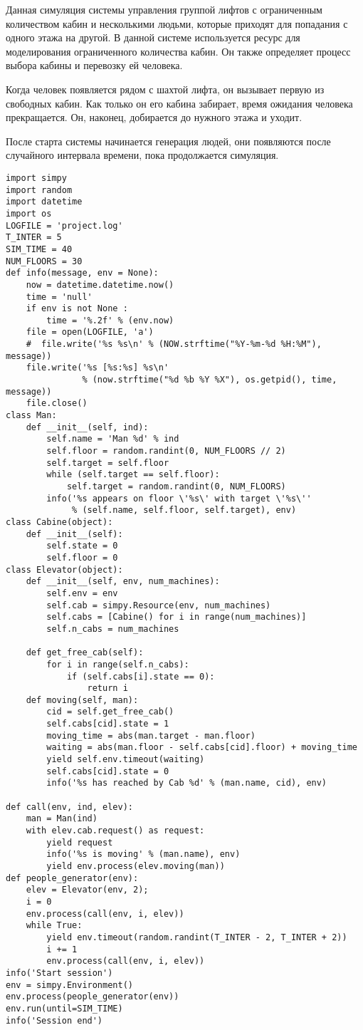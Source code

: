 
	Данная симуляция системы управления группой лифтов с ограниченным количеством кабин и несколькими людьми,
		которые приходят для попадания с одного этажа на другой.
		В данной системе используется ресурс для моделирования ограниченного количества кабин.
		Он также определяет процесс выбора кабины и перевозку ей человека.

	Когда человек появляется рядом с шахтой лифта, он вызывает первую из свободных кабин.
		Как только он его кабина забирает, время ожидания человека прекращается.
		Он, наконец, добирается до нужного этажа и уходит.

	После старта системы начинается генерация людей, они появляются после случайного интервала времени,
	пока продолжается симуляция.

\begin{lstlisting}[basicstyle=\footnotesize]
import simpy
import random
import datetime
import os
LOGFILE = 'project.log'
T_INTER = 5
SIM_TIME = 40
NUM_FLOORS = 30
def info(message, env = None):
    now = datetime.datetime.now()
    time = 'null'
    if env is not None :
        time = '%.2f' % (env.now)
    file = open(LOGFILE, 'a')
    #  file.write('%s %s\n' % (NOW.strftime("%Y-%m-%d %H:%M"), message))
    file.write('%s [%s:%s] %s\n'
               % (now.strftime("%d %b %Y %X"), os.getpid(), time, message))
    file.close()
class Man:
    def __init__(self, ind):
        self.name = 'Man %d' % ind
        self.floor = random.randint(0, NUM_FLOORS // 2)
        self.target = self.floor
        while (self.target == self.floor):
            self.target = random.randint(0, NUM_FLOORS)
        info('%s appears on floor \'%s\' with target \'%s\''
             % (self.name, self.floor, self.target), env)
class Cabine(object):
    def __init__(self):
        self.state = 0
        self.floor = 0
class Elevator(object):
    def __init__(self, env, num_machines):
        self.env = env
        self.cab = simpy.Resource(env, num_machines)
        self.cabs = [Cabine() for i in range(num_machines)]
        self.n_cabs = num_machines

    def get_free_cab(self):
        for i in range(self.n_cabs):
            if (self.cabs[i].state == 0):
                return i
    def moving(self, man):
        cid = self.get_free_cab()
        self.cabs[cid].state = 1
        moving_time = abs(man.target - man.floor)
        waiting = abs(man.floor - self.cabs[cid].floor) + moving_time
        yield self.env.timeout(waiting)
        self.cabs[cid].state = 0
        info('%s has reached by Cab %d' % (man.name, cid), env)

def call(env, ind, elev):
    man = Man(ind)
    with elev.cab.request() as request:
        yield request
        info('%s is moving' % (man.name), env)
        yield env.process(elev.moving(man))
def people_generator(env):
    elev = Elevator(env, 2);
    i = 0
    env.process(call(env, i, elev))
    while True:
        yield env.timeout(random.randint(T_INTER - 2, T_INTER + 2))
        i += 1
        env.process(call(env, i, elev))
info('Start session')
env = simpy.Environment()
env.process(people_generator(env))
env.run(until=SIM_TIME)
info('Session end')
\end{lstlisting}

